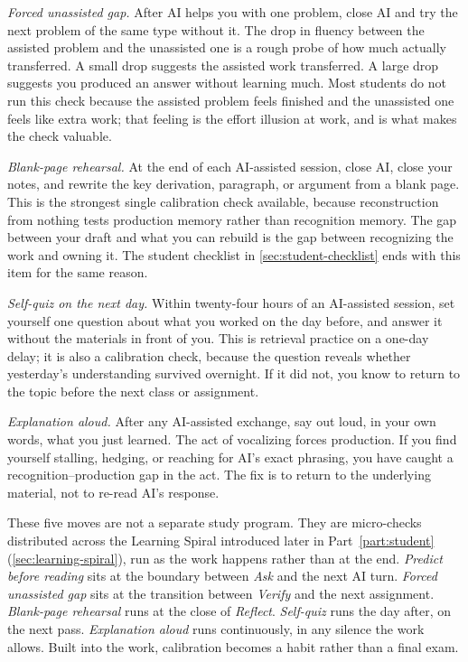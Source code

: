 \documentclass{SIAMbook2023}
\begin{document}
\emph{Forced unassisted gap.} After AI helps you with one problem, close AI and try the next problem of the same type without it. The drop in fluency between the assisted problem and the unassisted one is a rough probe of how much actually transferred. A small drop suggests the assisted work transferred. A large drop suggests you produced an answer without learning much. Most students do not run this check because the assisted problem feels finished and the unassisted one feels like extra work; that feeling is the effort illusion at work, and is what makes the check valuable.

\emph{Blank-page rehearsal.} At the end of each AI-assisted session, close AI, close your notes, and rewrite the key derivation, paragraph, or argument from a blank page. This is the strongest single calibration check available, because reconstruction from nothing tests production memory rather than recognition memory. The gap between your draft and what you can rebuild is the gap between recognizing the work and owning it. The student checklist in \cref{sec:student-checklist} ends with this item for the same reason.

\emph{Self-quiz on the next day.} Within twenty-four hours of an AI-assisted session, set yourself one question about what you worked on the day before, and answer it without the materials in front of you. This is retrieval practice on a one-day delay; it is also a calibration check, because the question reveals whether yesterday's understanding survived overnight. If it did not, you know to return to the topic before the next class or assignment.

\emph{Explanation aloud.} After any AI-assisted exchange, say out loud, in your own words, what you just learned. The act of vocalizing forces production. If you find yourself stalling, hedging, or reaching for AI's exact phrasing, you have caught a recognition--production gap in the act. The fix is to return to the underlying material, not to re-read AI's response.

These five moves are not a separate study program. They are micro-checks distributed across the Learning Spiral introduced later in Part~\ref{part:student} (\cref{sec:learning-spiral}), run as the work happens rather than at the end. \emph{Predict before reading} sits at the boundary between \emph{Ask} and the next AI turn. \emph{Forced unassisted gap} sits at the transition between \emph{Verify} and the next assignment. \emph{Blank-page rehearsal} runs at the close of \emph{Reflect}. \emph{Self-quiz} runs the day after, on the next pass. \emph{Explanation aloud} runs continuously, in any silence the work allows. Built into the work, calibration becomes a habit rather than a final exam.
\end{document}
